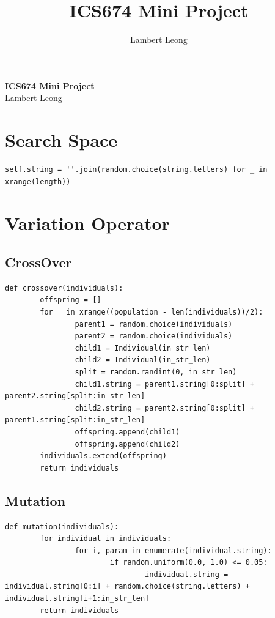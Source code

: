 \documentclass[12pt]{article}
\title{ICS674 Mini Project}
\author{Lambert Leong}
\begin{document}
\textbf{ICS674 Mini Project}
\\    Lambert Leong


\section{Search Space}

\begin{lstlisting}[caption = {Search space is all letter characters, upper and lower case }]
self.string = ''.join(random.choice(string.letters) for _ in xrange(length))
\end{lstlisting}

\section{Variation Operator}

\subsection{CrossOver}

\begin{lstlisting}[caption = { }]
def crossover(individuals):
        offspring = []
        for _ in xrange((population - len(individuals))/2):
                parent1 = random.choice(individuals)
                parent2 = random.choice(individuals)
                child1 = Individual(in_str_len)
                child2 = Individual(in_str_len)
                split = random.randint(0, in_str_len)
                child1.string = parent1.string[0:split] + parent2.string[split:in_str_len]
                child2.string = parent2.string[0:split] + parent1.string[split:in_str_len]
                offspring.append(child1)
                offspring.append(child2)
        individuals.extend(offspring)
        return individuals
\end{lstlisting}

\subsection{Mutation}

\begin{lstlisting}[caption = {}]
def mutation(individuals):
        for individual in individuals:
                for i, param in enumerate(individual.string):
                        if random.uniform(0.0, 1.0) <= 0.05:
                                individual.string = individual.string[0:i] + random.choice(string.letters) + individual.string[i+1:in_str_len]
        return individuals
\end{lstlisting}
\end{document}
